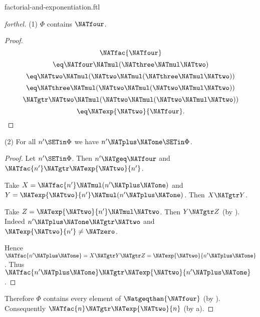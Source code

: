 \documentclass{stex}
\begin{document}
\begin{smodule}{factorial-and-exponentiation.ftl}
\begin{proof}[forthel]
  (1) $\Phi$ contains $\NATfour$.
  \begin{proof}
    \[  \NATfac{\NATfour}                                  \]
    \[    \eq \NATfour \NATmul (\NATthree \NATmul \NATtwo)             \]
    \[    \eq \NATtwo \NATmul (\NATtwo \NATmul (\NATthree \NATmul \NATtwo))   \]
    \[    \eq \NATthree \NATmul (\NATtwo \NATmul (\NATtwo \NATmul \NATtwo))   \]
    \[    \NATgtr \NATtwo \NATmul (\NATtwo \NATmul (\NATtwo \NATmul \NATtwo))   \]
    \[    \eq \NATexp{\NATtwo}{\NATfour}.                          \]
  \end{proof}

  (2) For all $n' \SETin \Phi$ we have $n' \NATplus \NATone \SETin \Phi$.
  \begin{proof}
    Let $n' \SETin \Phi$.
    Then $n' \NATgeq \NATfour$ and $\NATfac{n'} \NATgtr \NATexp{\NATtwo}{n'}$.

    Take $X = \NATfac{n'} \NATmul (n' \NATplus \NATone)$ and $Y = \NATexp{\NATtwo}{n'} \NATmul (n' \NATplus \NATone)$.
    Then $X \NATgtr Y$.

    Take $Z = \NATexp{\NATtwo}{n'} \NATmul \NATtwo$.
    Then $Y \NATgtr Z$ (by ).
    Indeed $n' \NATplus \NATone \NATgtr \NATtwo$ and $\NATexp{\NATtwo}{n'} \neq \NATzero$.

    Hence $\NATfac{n' \NATplus \NATone} = X \NATgtr Y \NATgtr Z = \NATexp{\NATtwo}{n' \NATplus \NATone}$.
    Thus $\NATfac{n' \NATplus \NATone} \NATgtr \NATexp{\NATtwo}{n' \NATplus \NATone}$.
  \end{proof}

  Therefore $\Phi$ contains every element of $\Natgeqthan{\NATfour}$ (by ).
  Consequently $\NATfac{n} \NATgtr \NATexp{\NATtwo}{n}$ (by a).
\end{proof}
\end{smodule}
\end{document}
